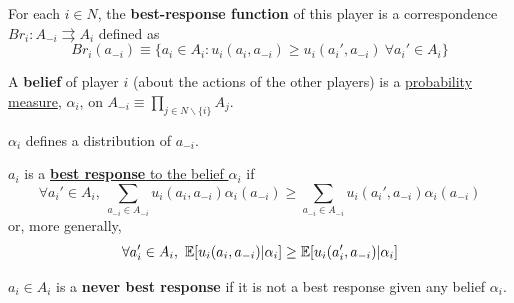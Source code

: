 \documentclass[11pt]{article}
\begin{document}
			\begin{definition}
				For each $i \in N$, the \textbf{best-response function} of this player is a correspondence $Br_i: A_{-i} \rightrightarrows A_i$ defined as
				\begin{equation}
					Br_i(a_{-i}) \equiv \{a_i \in A_i : u_i(a_i, a_{-i}) \geq u_i(a_i', a_{-i})\ \forall a_i' \in A_i \}
				\end{equation}
			\end{definition}
			
			\begin{definition}
				A \textbf{belief} of player $i$ (about the actions of the other players) is a \ul{probability measure}, $\alpha_i$, on $A_{-i} \equiv \prod_{j \in N \backslash \{i\}} A_j$.
			\end{definition}
			
			\begin{remark}
				$\alpha_i$ defines a distribution of $a_{-i}$.
			\end{remark}
			
			\begin{definition}
				$a_i$ is a \ul{\textbf{best response} to the belief $\alpha_i$} if
				\begin{equation}
					\forall a_i' \in A_i,\ \sum_{a_{-i} \in A_{-i}} u_i(a_i, a_{-i}) \alpha_i(a_{-i}) \geq \sum_{a_{-i} \in A_{-i}} u_i(a_i', a_{-i}) \alpha_i(a_{-i})
				\end{equation}
				or, more generally,
				\begin{equation}
					\forall a'_i \in A_i,\ \expect{u_i(a_i, a_{-i})|\alpha_i} \geq \expect{u_i(a_i', a_{-i})|\alpha_i}
				\end{equation}
			\end{definition}
			
			\begin{definition}
				$a_i \in A_i$ is a \textbf{never best response} if it is not a best response given any belief $\alpha_i$.
			\end{definition}
			
\end{document}
